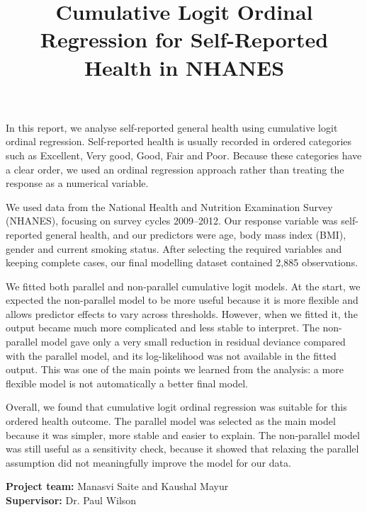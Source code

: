 \documentclass{article}
\title{Cumulative Logit Ordinal Regression for Self-Reported Health in
NHANES}
\author{
  }
\begin{document}
\maketitle


\begin{abstract}

\end{abstract}


In this report, we analyse self-reported general health using cumulative
logit ordinal regression. Self-reported health is usually recorded in
ordered categories such as Excellent, Very good, Good, Fair and Poor.
Because these categories have a clear order, we used an ordinal
regression approach rather than treating the response as a numerical
variable.

We used data from the National Health and Nutrition Examination Survey
(NHANES), focusing on survey cycles 2009--2012. Our response variable
was self-reported general health, and our predictors were age, body mass
index (BMI), gender and current smoking status. After selecting the
required variables and keeping complete cases, our final modelling
dataset contained 2,885 observations.

We fitted both parallel and non-parallel cumulative logit models. At the
start, we expected the non-parallel model to be more useful because it
is more flexible and allows predictor effects to vary across thresholds.
However, when we fitted it, the output became much more complicated and
less stable to interpret. The non-parallel model gave only a very small
reduction in residual deviance compared with the parallel model, and its
log-likelihood was not available in the fitted output. This was one of
the main points we learned from the analysis: a more flexible model is
not automatically a better final model.

Overall, we found that cumulative logit ordinal regression was suitable
for this ordered health outcome. The parallel model was selected as the
main model because it was simpler, more stable and easier to explain.
The non-parallel model was still useful as a sensitivity check, because
it showed that relaxing the parallel assumption did not meaningfully
improve the model for our data.

\begin{center}
\textbf{Project team:} Manasvi Saite and Kaushal Mayur\\
\textbf{Supervisor:} Dr. Paul Wilson
\end{center}
\end{document}
